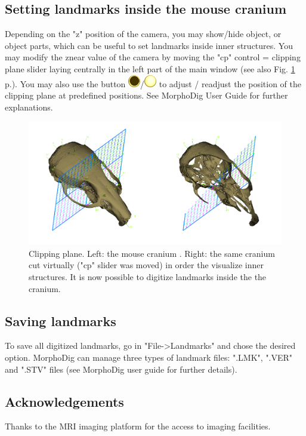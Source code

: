 \documentclass[12pt, a4paper]{book}
\begin{document}
\subsection{Setting landmarks inside the mouse cranium}
Depending on the "z" position of the camera, you may show/hide object, or object parts, which can be useful to set landmarks inside inner structures. You may modify the znear value of the camera by moving the "cp" control = clipping plane slider laying centrally in the left part of the main window (see also Fig. \ref{clipping} p.\pageref{clipping}). You may also use the button \includegraphics[scale=0.7]{../images/06/display/cpon.png}/\includegraphics[scale=0.5]{../images/06/display/cpoff.png}  to adjust / readjust the position of the clipping plane at predefined positions. See MorphoDig User Guide for further explanations. 
\begin{figure}
  \centering
  \includegraphics[scale=0.3]{clipping.png} 
	\caption{Clipping plane.  Left: the mouse cranium . Right: the same cranium cut virtually ("cp" slider was moved) in order the visualize inner structures. It is now possible to digitize landmarks inside the the cranium.}
\label{clipping}
 
\end{figure}

\subsection{Saving landmarks}
To save all digitized landmarks, go in "File->Landmarks" and chose the desired option. MorphoDig can manage three types of landmark files: ".LMK", ".VER" and ".STV" files (see MorphoDig user guide for further details).
\subsection{Acknowledgements}
Thanks to the MRI imaging platform for the access to imaging facilities.



%  		
\end{document}

